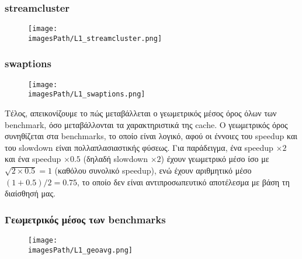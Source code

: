 \documentclass[12pt,a4paper]{article}
\newcommand{\imagesPath}{parsec-3.0/parsec_workspace/graphs}
\begin{document}
			\subsubsection{streamcluster}
				\begin{figure}[H]
					\begin{center}
						\texttt{[image: \\imagesPath/L1\_streamcluster.png]}
					\end{center}
				\end{figure}
						
			\subsubsection{swaptions}
				\begin{figure}[H]
					\begin{center}
						\texttt{[image: \\imagesPath/L1\_swaptions.png]}
					\end{center}
				\end{figure}
						
			Τέλος, απεικονίζουμε το πώς μεταβάλλεται ο γεωμετρικός μέσος όρος όλων των benchmark, όσο μεταβάλλονται τα χαρακτηριστικά της cache. Ο γεωμετρικός όρος συνηθίζεται στα benchmarks, το οποίο είναι λογικό, αφού οι έννοιες του speedup και του slowdown είναι πολλαπλασιαστικής φύσεως. Για παράδειγμα, ένα speedup $\times 2$ και ένα speedup $\times 0.5$ (δηλαδή slowdown $\times 2$) έχουν γεωμετρικό μέσο ίσο με $\sqrt{2 \times 0.5} = 1$ (καθόλου συνολικό speedup), ενώ έχουν αριθμητικό μέσο $(1+0.5)/2 = 0.75$, το οποίο δεν είναι αντιπροσωπευτικό αποτέλεσμα με βάση τη διαίσθησή μας.
			
			\subsubsection{Γεωμετρικός μέσος των benchmarks}
				\begin{figure}[H]
					\begin{center}
						\texttt{[image: \\imagesPath/L1\_geoavg.png]}
					\end{center}
				\end{figure}
						
\end{document}

